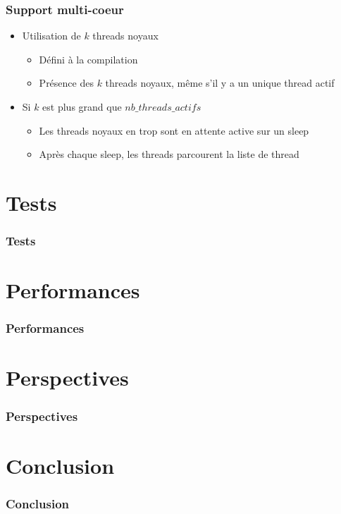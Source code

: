 \documentclass{beamer}
\begin{document}
\begin{frame}
  \frametitle{Support multi-coeur}
  \begin{itemize}
    \item Utilisation de $k$ threads noyaux
      \begin{itemize}
      \item Défini à la compilation
      \item Présence des $k$ threads noyaux, même s'il y a un unique thread
        actif
      \end{itemize}
    \item Si $k$ est plus grand que $nb\_threads\_actifs$
      \begin{itemize}
        \item Les threads noyaux en trop sont en attente active sur un sleep
        \item Après chaque sleep, les threads parcourent la liste de thread
      \end{itemize}
  \end{itemize}
\end{frame}

\section{Tests}

\begin{frame}
  \frametitle{Tests}
\end{frame}

\section{Performances}

\begin{frame}
  \frametitle{Performances}
\end{frame}

\section{Perspectives}

\begin{frame}
  \frametitle{Perspectives}
\end{frame}

\section{Conclusion}

\begin{frame}
  \frametitle{Conclusion}
\end{frame}


 
\end{document}
